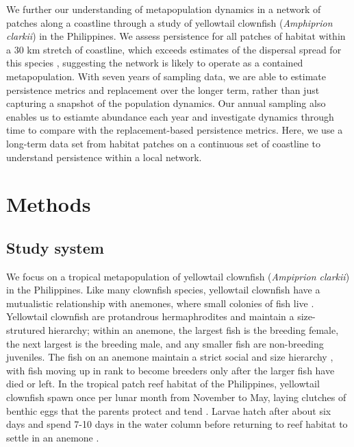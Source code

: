 \documentclass[12pt, oneside]{article}   	%
\begin{document}
We further our understanding of metapopulation dynamics in a network of patches along a coastline through a study of yellowtail clownfish (\textit{Amphiprion clarkii}) in the Philippines. We assess persistence for all patches of habitat within a 30 km stretch of coastline, which exceeds estimates of the dispersal spread for this species \citep{pinsky2010using}, suggesting the network is likely to operate as a contained metapopulation. With seven years of sampling data, we are able to estimate persistence metrics and replacement over the longer term, rather than just capturing a snapshot of the population dynamics. Our annual sampling also enables us to estiamte abundance each year and investigate dynamics through time to compare with the replacement-based persistence metrics. Here, we use a long-term data set from habitat patches on a continuous set of coastline to understand persistence within a local network. %


\section*{Methods} 

\subsection*{Study system}

We focus on a tropical metapopulation of yellowtail clownfish (\textit{Ampiprion clarkii}) in the Philippines. Like many clownfish species, yellowtail clownfish have a mutualistic relationship with anemones, where small colonies of fish live \citep{buston2003social, fautin1992field}. Yellowtail clownfish are protandrous hermaphrodites and maintain a size-strutured hierarchy; within an anemone, the largest fish is the breeding female, the next largest is the breeding male, and any smaller fish are non-breeding juveniles. The fish on an anemone maintain a strict social and size hierarchy \citep{buston2003social}, with fish moving up in rank to become breeders only after the larger fish have died or left. In the tropical patch reef habitat of the Philippines, yellowtail clownfish spawn once per lunar month from November to May, laying clutches of benthic eggs that the parents protect and tend \citep{ochi1989mating}. Larvae hatch after about six days and spend 7-10 days in the water column before returning to reef habitat to settle in an anemone \citep{fautin1992field}.
\end{document}
